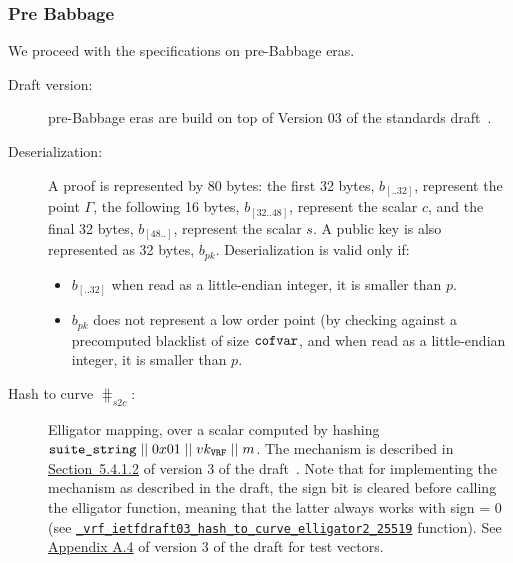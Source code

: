 \subsubsection{Pre Babbage}
We proceed with the specifications on pre-Babbage eras.
\begin{description}
\item[Draft version:] pre-Babbage eras are build on top of Version 03 of the standards draft~\cite{vrfdraft03}.
\item[Deserialization:] A \vrf proof is represented by 80 bytes: the first 32 bytes, $b_{[..32]}$, represent the point $\Gamma$, the following 16 bytes, $b_{[32..48]}$, represent the scalar $c$, and the final 32 bytes, $b_{[48..]}$, represent the scalar $s$. A public key is also represented as 32 bytes, $b_{pk}$. Deserialization is valid only if:
\begin{itemize}
\item $b_{[..32]}$ when read as a little-endian integer, it is smaller than $p$.
\item $b_{pk}$ does not represent a low order point (by checking against a precomputed blacklist of size $\texttt{cofvar}$, and when read as a little-endian integer, it is smaller than $p$.
\end{itemize}
\item[Hash to curve $\hash_{s2c}$:] \sloppy Elligator mapping, over a scalar computed by
hashing $\texttt{suite\_string}\;||\; 0x01\;||\; vk_{\texttt{VRF}} \;||\; m$. The 
mechanism is described in \href{https://datatracker.ietf.org/doc/html/draft-irtf-cfrg-vrf-03#section-5.4.1.2}{Section~5.4.1.2} of version 3 of the draft~\cite{vrfdraft03}. Note that for 
implementing the mechanism as described in the draft, the sign bit is cleared before calling
the elligator function, meaning that the latter always works with sign = 0 (see \href{https://github.com/input-output-hk/libsodium/blob/tdammers/rebased-vrf/src/libsodium/crypto_vrf/ietfdraft03/convert.c#L84}{\texttt{\_vrf\_ietfdraft03\_hash\_to\_curve\_elligator2\_25519}}
function). See \href{https://datatracker.ietf.org/doc/html/draft-irtf-cfrg-vrf-03#appendix-A.4}{Appendix A.4} of version 3 of the draft for test vectors. 
\end{description}


